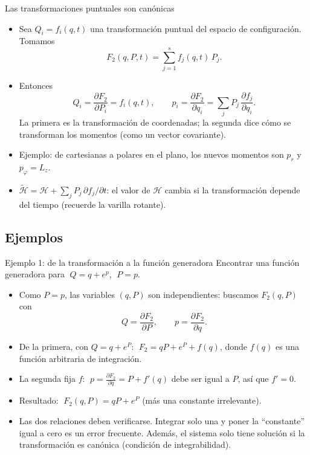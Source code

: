\documentclass[spanish]{beamer}
\newcommand{\Ham}{\mathcal{H}}               %
\newcommand{\tH}{\tilde{\mathcal{H}}}        %
\newcommand{\pd}[2]{\frac{\partial #1}{\partial #2}}
\begin{document}
\begin{frame}{Las transformaciones puntuales son canónicas}
\begin{itemize}[<+->]
  \item Sea $Q_i=f_i(q,t)$ una transformación puntual del espacio de configuración.
        Tomamos
        \[
          F_2(q,P,t)=\sum_{j=1}^s f_j(q,t)\,P_j .
        \]
  \item Entonces
        \[
          Q_i=\pd{F_2}{P_i}=f_i(q,t),\qquad
          p_i=\pd{F_2}{q_i}=\sum_j P_j\,\pd{f_j}{q_i}.
        \]
        La primera es la transformación de coordenadas; la segunda dice cómo se
        transforman los momentos (como un vector covariante).
  \item Ejemplo: de cartesianas a polares en el plano, los nuevos momentos son
        $p_r$ y $p_\varphi=L_z$.
  \item $\tH=\Ham+\sum_j P_j\,\partial f_j/\partial t$: el valor de $\Ham$ cambia si la
        transformación depende del tiempo (recuerde la varilla rotante).
\end{itemize}
\end{frame}

\subsection{Ejemplos}
\begin{frame}{Ejemplo 1: de la transformación a la función generadora}
Encontrar una función generadora para $\;Q=q+e^p$, $\;P=p$.
\begin{itemize}[<+->]
  \item Como $P=p$, las variables $(q,P)$ son independientes: buscamos $F_2(q,P)$ con
        \[
          Q=\pd{F_2}{P},\qquad p=\pd{F_2}{q}.
        \]
  \item De la primera, con $Q=q+e^P$:
        $\;F_2=qP+e^P+f(q)$, donde $f(q)$ es una función arbitraria de integración.
  \item La segunda fija $f$: $\;p=\pd{F_2}{q}=P+f'(q)$ debe ser igual a $P$, así que
        $f'=0$.
  \item Resultado: $\;F_2(q,P)=qP+e^P$ (más una constante irrelevante).
  \item \alert{Las dos relaciones deben verificarse.} Integrar solo una y poner la
        “constante” igual a cero es un error frecuente.
        Además, el sistema solo tiene solución si la transformación es canónica
        (condición de integrabilidad).
\end{itemize}
\end{frame}
\end{document}
